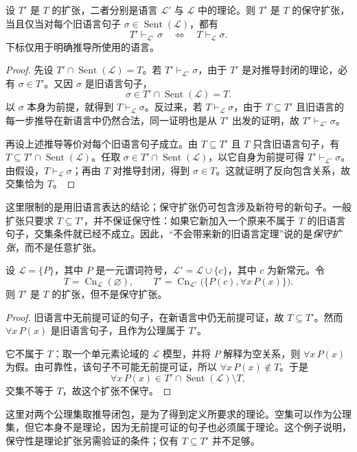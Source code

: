 \documentclass[lang=cn,a4paper,fontset=none,zihao=false,10pt,openany,twoside]{beautybook}
\numberwithin{algorithm}{chapter}
\begin{document}
\begin{proposition}[保守扩张的推导刻画]
设 $T'$ 是 $T$ 的扩张，二者分别是语言 $\mathcal L'$ 与 $\mathcal L$ 中的理论。则 $T'$ 是 $T$ 的保守扩张，当且仅当对每个旧语言句子 $\sigma\in\operatorname{Sent}(\mathcal L)$，都有
\[
 T'\vdash_{\mathcal L'}\sigma
 \quad\Longleftrightarrow\quad
 T\vdash_{\mathcal L}\sigma.
\]
下标仅用于明确推导所使用的语言。
\end{proposition}
\begin{proof}
先设 $T'\cap\operatorname{Sent}(\mathcal L)=T$。若 $T'\vdash_{\mathcal L'}\sigma$，由于 $T'$ 是对推导封闭的理论，必有 $\sigma\in T'$。又因 $\sigma$ 是旧语言句子，
\[
 \sigma\in T'\cap\operatorname{Sent}(\mathcal L)=T.
\]
以 $\sigma$ 本身为前提，就得到 $T\vdash_{\mathcal L}\sigma$。反过来，若 $T\vdash_{\mathcal L}\sigma$，由于 $T\subseteq T'$ 且旧语言的每一步推导在新语言中仍然合法，同一证明也是从 $T'$ 出发的证明，故 $T'\vdash_{\mathcal L'}\sigma$。

再设上述推导等价对每个旧语言句子成立。由 $T\subseteq T'$ 且 $T$ 只含旧语言句子，有 $T\subseteq T'\cap\operatorname{Sent}(\mathcal L)$。任取 $\sigma\in T'\cap\operatorname{Sent}(\mathcal L)$，以它自身为前提可得 $T'\vdash_{\mathcal L'}\sigma$。由假设，$T\vdash_{\mathcal L}\sigma$；再由 $T$ 对推导封闭，得到 $\sigma\in T$。这就证明了反向包含关系，故交集恰为 $T$。
\end{proof}
这里限制的是用旧语言表达的结论；保守扩张仍可包含涉及新符号的新句子。一般扩张只要求 $T\subseteq T'$，并不保证保守性：如果它新加入一个原来不属于 $T$ 的旧语言句子，交集条件就已经不成立。因此，“不会带来新的旧语言定理”说的是\emph{保守扩张}，而不是任意扩张。

\begin{example}[非保守的扩张]
设 $\mathcal L=\{P\}$，其中 $P$ 是一元谓词符号，$\mathcal L'=\mathcal L\cup\{c\}$，其中 $c$ 为新常元。令
\[
 T=\operatorname{Cn}_{\mathcal L}(\varnothing),\qquad
 T'=\operatorname{Cn}_{\mathcal L'}\bigl(\{P(c),\forall x\,P(x)\}\bigr).
\]
则 $T'$ 是 $T$ 的扩张，但不是保守扩张。
\end{example}
\begin{proof}
旧语言中无前提可证的句子，在新语言中仍无前提可证，故 $T\subseteq T'$。然而 $\forall x\,P(x)$ 是旧语言句子，且作为公理属于 $T'$。

它不属于 $T$：取一个单元素论域的 $\mathcal L$ 模型，并将 $P$ 解释为空关系，则 $\forall x\,P(x)$ 为假。由可靠性，该句子不可能无前提可证，所以 $\forall x\,P(x)\notin T$。于是
\[
 \forall x\,P(x)\in T'\cap\operatorname{Sent}(\mathcal L)\setminus T,
\]
交集不等于 $T$，故这个扩张不保守。
\end{proof}
这里对两个公理集取推导闭包，是为了得到定义所要求的理论。空集可以作为公理集，但它本身不是理论，因为无前提可证的句子也必须属于理论。这个例子说明，保守性是理论扩张另需验证的条件；仅有 $T\subseteq T'$ 并不足够。
\end{document}
